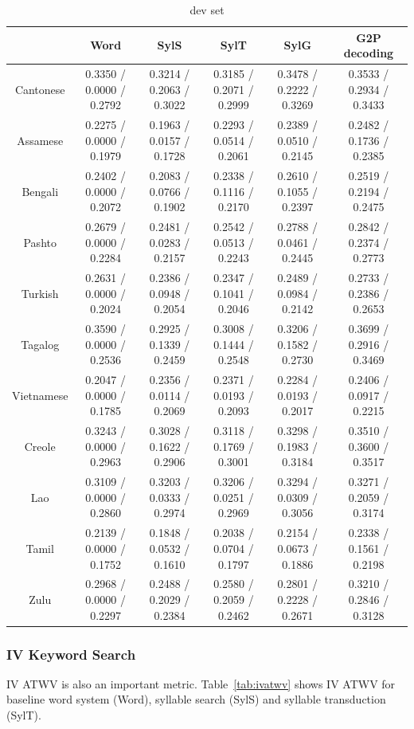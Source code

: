 \documentclass[journal]{IEEEtran}
\begin{document}
\begin{table}[t]
  \caption{dev set}
  \label{tab:devatwv}
  \centering
  \begin{tabular}{|c|c|c|c|c|c|}
    \hline
              & Word & SylS  & SylT & SylG & G2P decoding \\
    \hline
    Cantonese & 0.3350 / 0.0000 / 0.2792 & 0.3214 / 0.2063 / 0.3022 & 0.3185 / 0.2071 / 0.2999 & 0.3478 / 0.2222 / 0.3269 & 0.3533 / 0.2934 / 0.3433 \\
    Assamese  & 0.2275 / 0.0000 / 0.1979 & 0.1963 / 0.0157 / 0.1728 & 0.2293 / 0.0514 / 0.2061 & 0.2389 / 0.0510 / 0.2145 & 0.2482 / 0.1736 / 0.2385 \\
    Bengali   & 0.2402 / 0.0000 / 0.2072 & 0.2083 / 0.0766 / 0.1902 & 0.2338 / 0.1116 / 0.2170 & 0.2610 / 0.1055 / 0.2397 & 0.2519 / 0.2194 / 0.2475 \\
    Pashto    & 0.2679 / 0.0000 / 0.2284 & 0.2481 / 0.0283 / 0.2157 & 0.2542 / 0.0513 / 0.2243 & 0.2788 / 0.0461 / 0.2445 & 0.2842 / 0.2374 / 0.2773 \\
    Turkish   & 0.2631 / 0.0000 / 0.2024 & 0.2386 / 0.0948 / 0.2054 & 0.2347 / 0.1041 / 0.2046 & 0.2489 / 0.0984 / 0.2142 & 0.2733 / 0.2386 / 0.2653 \\
    Tagalog   & 0.3590 / 0.0000 / 0.2536 & 0.2925 / 0.1339 / 0.2459 & 0.3008 / 0.1444 / 0.2548 & 0.3206 / 0.1582 / 0.2730 & 0.3699 / 0.2916 / 0.3469 \\
    Vietnamese& 0.2047 / 0.0000 / 0.1785 & 0.2356 / 0.0114 / 0.2069 & 0.2371 / 0.0193 / 0.2093 & 0.2284 / 0.0193 / 0.2017 & 0.2406 / 0.0917 / 0.2215 \\
    Creole    & 0.3243 / 0.0000 / 0.2963 & 0.3028 / 0.1622 / 0.2906 & 0.3118 / 0.1769 / 0.3001 & 0.3298 / 0.1983 / 0.3184 & 0.3510 / 0.3600 / 0.3517 \\
    Lao       & 0.3109 / 0.0000 / 0.2860 & 0.3203 / 0.0333 / 0.2974 & 0.3206 / 0.0251 / 0.2969 & 0.3294 / 0.0309 / 0.3056 & 0.3271 / 0.2059 / 0.3174 \\
    Tamil     & 0.2139 / 0.0000 / 0.1752 & 0.1848 / 0.0532 / 0.1610 & 0.2038 / 0.0704 / 0.1797 & 0.2154 / 0.0673 / 0.1886 & 0.2338 / 0.1561 / 0.2198 \\
    Zulu      & 0.2968 / 0.0000 / 0.2297 & 0.2488 / 0.2029 / 0.2384 & 0.2580 / 0.2059 / 0.2462 & 0.2801 / 0.2228 / 0.2671 & 0.3210 / 0.2846 / 0.3128 \\
    \hline
  \end{tabular}
\end{table}


\subsubsection{IV Keyword Search}
IV ATWV is also an important metric. Table~\ref{tab:ivatwv} 
shows IV ATWV for baseline word system (Word), syllable search (SylS) and syllable transduction (SylT).
\end{document}
